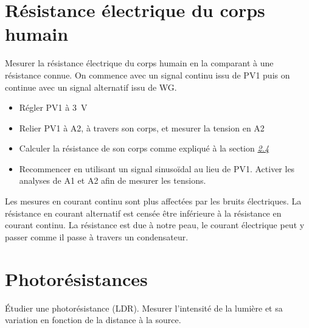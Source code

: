 \documentclass[a4paper,12pt,french]{sphinxmanual}
\let\sphinxpxdimen\pdfpxdimen\else\newdimen\sphinxpxdimen
\begin{document}
\section{Résistance électrique du corps humain}
\label{\detokenize{2.13:resistance-electrique-du-corps-humain}}\label{\detokenize{2.13::doc}}

Mesurer la résistance électrique du corps humain en la comparant à une
résistance connue. On commence avec un signal continu issu de PV1 puis
on continue avec un signal alternatif issu de WG.

\noindent\sphinxincludegraphics[width=300\sphinxpxdimen]{{res-body}.pdf}

\begin{itemize}
\item {} 
Régler PV1 à 3 V

\item {} 
Relier PV1 à A2, à travers son corps, et mesurer la tension en A2

\item {} 
Calculer la résistance de son corps comme expliqué à la section
{\hyperref[\detokenize{2.13:sec:Measure-resistance-by-comparison}]{\emph{2.4}}}

\item {} 
Recommencer en utilisant un signal sinusoïdal au lieu de PV1. Activer
les analyses de A1 et A2 afin de mesurer les tensions.

\end{itemize}


Les mesures en courant continu sont plus affectées par les bruits
électriques. La résistance en courant alternatif est censée être
inférieure à la résistance en courant continu. La résistance est due à
notre peau, le courant électrique peut y passer comme il passe à travers
un condensateur.


\section{Photorésistances}
\label{\detokenize{2.14:photoresistances}}\label{\detokenize{2.14::doc}}

Étudier une photorésistance (LDR). Mesurer l’intensité de la lumière et
sa variation en fonction de la distance à la source.

\noindent\sphinxincludegraphics[width=300\sphinxpxdimen]{{ldr}.pdf}
\end{document}
